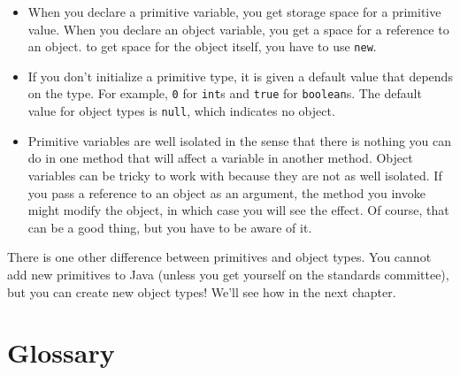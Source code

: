 \documentclass[12pt]{book}
\theoremstyle{definition}
\begin{document}
\begin{itemize}

\item When you declare a primitive variable, you get storage
space for a primitive value.  When you declare an object variable, you
get a space for a reference to an object.  to get space for
the object itself, you have to use {\tt new}.

\item If you don't initialize a primitive type, it is given
a default value that depends on the type.  For example,
{\tt 0} for {\tt int}s and {\tt true} for {\tt boolean}s.
The default value for object types is {\tt null}, which indicates
no object.

\item Primitive variables are well isolated in the sense that there is
nothing you can do in one method that will affect a variable in
another method.  Object variables can be tricky to work with because
they are not as well isolated.  If you pass a reference to an object
as an argument, the method you invoke might modify the object, in which
case you will see the effect.  Of course, that can be a good thing, but you
have to be aware of it.

\end{itemize}

There is one other difference between primitives and object
types.  You cannot add new primitives to Java
(unless you get yourself on the standards committee), but
you can create new object types!  We'll see how in the next
chapter.

\section{Glossary}
\end{document}
